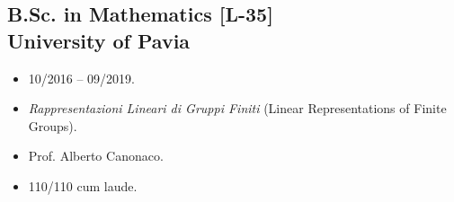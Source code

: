 \documentclass[11pt,a4paper]{article}
\begin{document}
\subsection*{B.Sc. in Mathematics [L-35] \\ \small University of Pavia}
\begin{itemize}[noitemsep, labelwidth=*,align=left, labelwidth=!]
    \item[Dates:] 10/2016 -- 09/2019.
    \item[Thesis title:] \emph{Rappresentazioni Lineari di Gruppi Finiti} (Linear Representations of Finite Groups).
    \item[Supervisor:] Prof. Alberto Canonaco.
    \item[Grade:] 110/110 cum laude.
\end{itemize}
\end{document}
